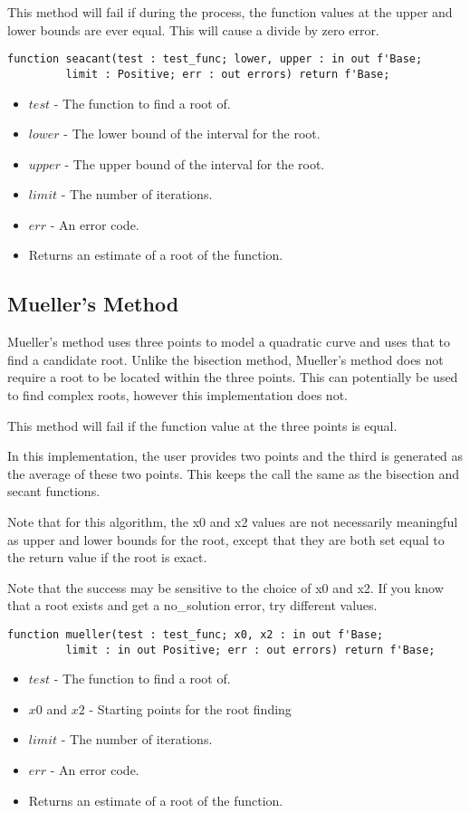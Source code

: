\documentclass[10pt, openany]{book}
\begin{document}
This method will fail if during the process, the function values at the upper and lower bounds are ever equal.  This will cause a divide by zero error.
\begin{lstlisting}
function seacant(test : test_func; lower, upper : in out f'Base;
         limit : Positive; err : out errors) return f'Base;
\end{lstlisting}
\begin{itemize}
  \item $test$ - The function to find a root of.
  \item $lower$ - The lower bound of the interval for the root.
  \item $upper$ - The upper bound of the interval for the root.
  \item $limit$ - The number of iterations.
  \item $err$ - An error code.
  \item Returns an estimate of a root of the function.
\end{itemize}

\subsection{Mueller's Method}
Mueller's method uses three points to model a quadratic curve and uses that to find a candidate root.    Unlike the bisection method, Mueller's method does not require a root to be located within the three points.  This can potentially be used to find complex roots, however this implementation does not.

This method will fail if the function value at the three points is equal.

In this implementation, the user provides two points and the third is generated as the average of these two points.  This keeps the call the same as the bisection and secant functions.

Note that for this algorithm, the x0 and x2 values are not necessarily meaningful as upper and lower bounds for the root, except that they are both set equal to the return value if the root is exact.

Note that the success may be sensitive to the choice of x0 and x2.  If you know that a root exists and get a no\_solution error, try different values.
\begin{lstlisting}
function mueller(test : test_func; x0, x2 : in out f'Base;
         limit : in out Positive; err : out errors) return f'Base;
\end{lstlisting}
\begin{itemize}
  \item $test$ - The function to find a root of.
  \item $x0$ and $x2$ - Starting points for the root finding
  \item $limit$ - The number of iterations.
  \item $err$ - An error code.
  \item Returns an estimate of a root of the function.
\end{itemize}
\end{document}

